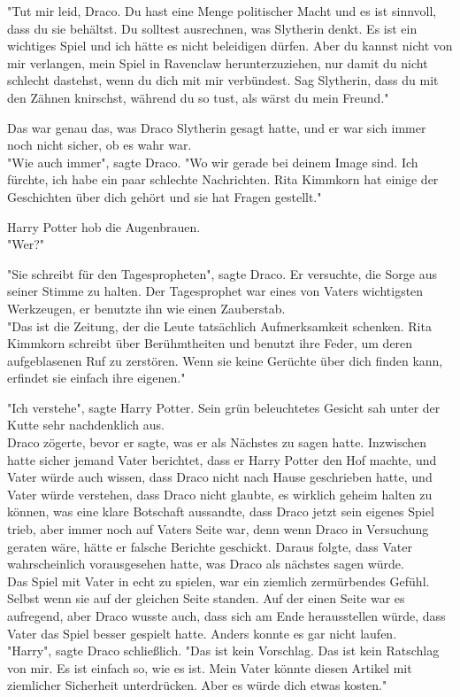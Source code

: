 {"Tut mir leid, Draco. Du hast eine Menge politischer Macht und es ist sinnvoll, dass du sie behältst. Du solltest ausrechnen, was Slytherin denkt. Es ist ein wichtiges Spiel und ich hätte es nicht beleidigen dürfen. Aber du kannst nicht von mir verlangen, mein Spiel in Ravenclaw herunterzuziehen, nur damit du nicht schlecht dastehst, wenn du dich mit mir verbündest. Sag Slytherin, dass du mit den Zähnen knirschst, während du so tust, als wärst du mein Freund."

Das war genau das, was Draco Slytherin gesagt hatte, und er war sich immer noch nicht sicher, ob es wahr war.\\ "Wie auch immer", sagte Draco. "Wo wir gerade bei deinem Image sind. Ich fürchte, ich habe ein paar schlechte Nachrichten. Rita Kimmkorn hat einige der Geschichten über dich gehört und sie hat Fragen gestellt."

Harry Potter hob die Augenbrauen.\\ "Wer?"

"Sie schreibt für den Tagespropheten", sagte Draco. Er versuchte, die Sorge aus seiner Stimme zu halten. Der Tagesprophet war eines von Vaters wichtigsten Werkzeugen, er benutzte ihn wie einen Zauberstab.\\ "Das ist die Zeitung, der die Leute tatsächlich Aufmerksamkeit schenken. Rita Kimmkorn schreibt über Berühmtheiten und benutzt ihre Feder, um deren aufgeblasenen Ruf zu zerstören. Wenn sie keine Gerüchte über dich finden kann, erfindet sie einfach ihre eigenen."

"Ich verstehe", sagte Harry Potter. Sein grün beleuchtetes Gesicht sah unter der Kutte sehr nachdenklich aus.\\ Draco zögerte, bevor er sagte, was er als Nächstes zu sagen hatte. Inzwischen hatte sicher jemand Vater berichtet, dass er Harry Potter den Hof machte, und Vater würde auch wissen, dass Draco nicht nach Hause geschrieben hatte, und Vater würde verstehen, dass Draco nicht glaubte, es wirklich geheim halten zu können, was eine klare Botschaft aussandte, dass Draco jetzt sein eigenes Spiel trieb, aber immer noch auf Vaters Seite war, denn wenn Draco in Versuchung geraten wäre, hätte er falsche Berichte geschickt. Daraus folgte, dass Vater wahrscheinlich vorausgesehen hatte, was Draco als nächstes sagen würde.\\ Das Spiel mit Vater in echt zu spielen, war ein ziemlich zermürbendes Gefühl. Selbst wenn sie auf der gleichen Seite standen. Auf der einen Seite war es aufregend, aber Draco wusste auch, dass sich am Ende herausstellen würde, dass Vater das Spiel besser gespielt hatte. Anders konnte es gar nicht laufen.\\ "Harry", sagte Draco schließlich. "Das ist kein Vorschlag. Das ist kein Ratschlag von mir. Es ist einfach so, wie es ist. Mein Vater könnte diesen Artikel mit ziemlicher Sicherheit unterdrücken. Aber es würde dich etwas kosten."

}
